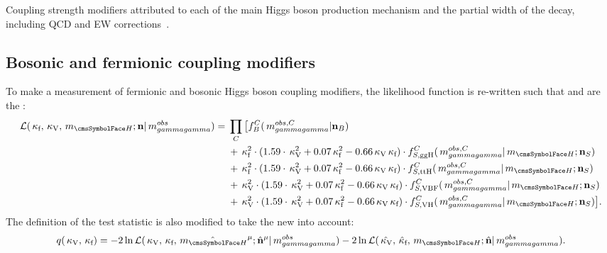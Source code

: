  \begin{table}[h]
 \resizebox{\textwidth}{!}{

}
 \caption[Coupling strength modifiers attributed to each of the main Higgs boson production mechanism \crosssection\s and the partial width of the \Hgg decay, including QCD and EW corrections\quad\cite{Khachatryan:2016vau}.]{Coupling strength modifiers attributed to each of the main Higgs boson production mechanism \crosssection\s and the partial width of the \Hgg decay, including QCD and EW corrections~\cite{Khachatryan:2016vau}.}
 \label{tab:statandresults:kappas}
\end{table}

\subsection{Bosonic and fermionic coupling modifiers}
To make a measurement of fermionic and bosonic Higgs boson coupling modifiers, the likelihood function is re-written such that \kf and \kV are the \POI\s: 
\begin{equation}
\label{eq:statandresults:likelihood_function_kvkf}
\begin{split}
\mathcal{L}(\kf,\kV, \mH; \mathbf{n} | \mgg^{obs} ) ={}&\prod_C \big[  f^C_B(\mgg^{obs,C} | \mathbf{n}_B )  \\ 
& + \kf^2\cdot(1.59\cdot\kV^2 + 0.07\kf^2 - 0.66\kV\kf) \cdot f^C_{S,{\text{ggH}}}(\mgg^{obs,C} |\mH; \mathbf{n}_S) \\ 
& + \kf^2\cdot(1.59\cdot\kV^2 + 0.07\kf^2 - 0.66\kV\kf) \cdot f^C_{S,{\text{ttH}}}(\mgg^{obs,C} |\mH; \mathbf{n}_S)  \\ 
& + \kV^2\cdot(1.59\cdot\kV^2 + 0.07\kf^2 - 0.66\kV\kf) \cdot f^C_{S,{\text{VBF}}}(\mgg^{obs,C} |\mH; \mathbf{n}_S)  \\
& + \kV^2\cdot(1.59\cdot\kV^2 + 0.07\kf^2 - 0.66\kV\kf) \cdot f^C_{S,{\text{VH}}}(\mgg^{obs,C} |\mH; \mathbf{n}_S)   \big]. 
\end{split}
\end{equation}
The definition of the test statistic is also modified to take the new \POI\s into account:
\begin{equation}
\label{eq:statandresults:test_statistic_kvkf}
 q(\kV,\kf)= -2 \ln \mathcal{L}(\kV,\kf,\hat{\mH}^{\mu}; \hat{\mathbf{n}}^{\mu}| \mgg^{obs})- 2\ln\mathcal{L}(\hat{\kV},\hat{\kf},\mH;\hat{\mathbf{n}}| \mgg^{obs} ).
\end{equation}

